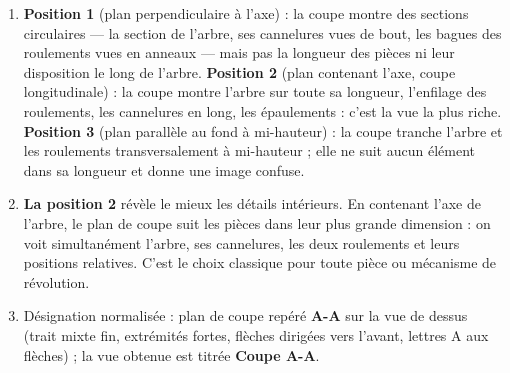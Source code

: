 \documentclass[11pt]{article}
\begin{document}
\begin{corrige}
\begin{enumerate}
\item \textbf{Position 1} (plan perpendiculaire à l'axe) : la coupe montre des sections circulaires — la section de l'arbre, ses cannelures vues de bout, les bagues des roulements vues en anneaux — mais pas la longueur des pièces ni leur disposition le long de l'arbre.
\textbf{Position 2} (plan contenant l'axe, coupe longitudinale) : la coupe montre l'arbre sur toute sa longueur, l'enfilage des roulements, les cannelures en long, les épaulements : c'est la vue la plus riche.
\textbf{Position 3} (plan parallèle au fond à mi-hauteur) : la coupe tranche l'arbre et les roulements transversalement à mi-hauteur ; elle ne suit aucun élément dans sa longueur et donne une image confuse.
\item \textbf{La position 2} révèle le mieux les détails intérieurs. En contenant l'axe de l'arbre, le plan de coupe suit les pièces dans leur plus grande dimension : on voit simultanément l'arbre, ses cannelures, les deux roulements et leurs positions relatives. C'est le choix classique pour toute pièce ou mécanisme de révolution.
\item Désignation normalisée : plan de coupe repéré \textbf{A-A} sur la vue de dessus (trait mixte fin, extrémités fortes, flèches dirigées vers l'avant, lettres A aux flèches) ; la vue obtenue est titrée \textbf{Coupe A-A}.
\end{enumerate}
\end{corrige}
\end{document}
